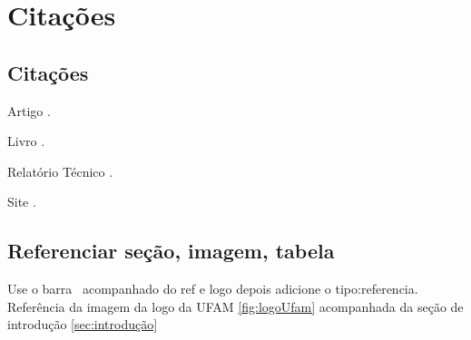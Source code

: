
\chapter{Citações}

	\section{Citações}
	    
		Artigo \cite{higginbottom1998performance}.
		
        Livro \cite{kurose2013computer}.
        
        Relatório Técnico \cite{Scott2007}.
        
        Site \cite{Raspberry}.
		
	\section{Referenciar seção, imagem, tabela}
	    Use o barra \ acompanhado do ref e logo depois adicione o tipo:referencia. Referência da imagem da logo da UFAM \ref{fig:logoUfam} acompanhada da seção de introdução \ref{sec:introdução}
		